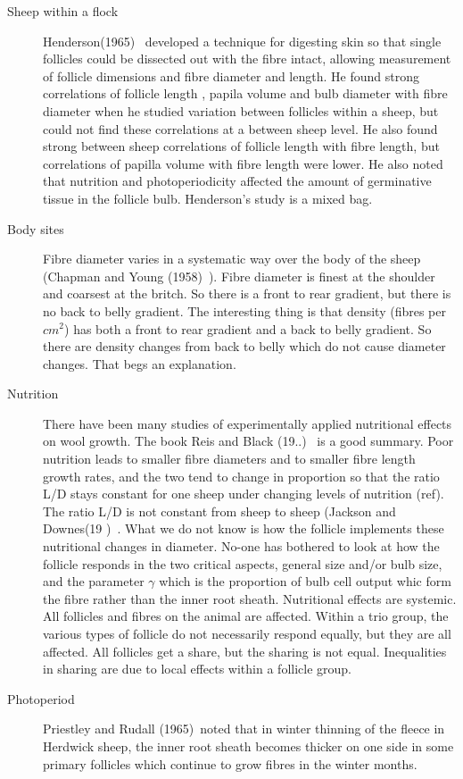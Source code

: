\documentclass[titlepage]{article}  %
\begin{document}
\begin{description}
\item[Sheep within a flock] Henderson(1965)~\cite{hend:65} developed a technique for digesting skin so that single follicles could be dissected out with the fibre intact, allowing measurement of follicle dimensions and fibre diameter and length. He found strong correlations of follicle length , papila volume and bulb diameter with fibre diameter when he studied variation between follicles within a sheep, but could not find these correlations at a between sheep level. He also found strong between sheep correlations of follicle length with fibre length, but correlations of papilla volume with fibre length were lower.  He also noted that nutrition and photoperiodicity affected the amount of germinative tissue in the follicle bulb. Henderson's study is a mixed bag.
\item[Body sites] Fibre diameter varies in a systematic way over the body of the sheep (Chapman and Young (1958)~\cite{chap:58}). Fibre diameter is finest at the shoulder and coarsest at the britch. So there is a front to rear gradient, but there is no back to belly gradient. The interesting thing is that density (fibres per $cm^{2}$) has both a front to rear gradient and a back to belly gradient.  So there are density changes from back to belly which do not cause diameter changes.  That begs an explanation.
\item[Nutrition]
There have been many studies of experimentally applied nutritional effects on wool growth. 
The book Reis and Black (19..)~\cite{} is a good summary.
Poor nutrition leads to smaller fibre diameters and to smaller fibre length growth rates, and the two tend to change in proportion so that the ratio L/D stays constant for one sheep under changing levels of nutrition (ref). The ratio L/D is not constant from sheep to sheep (Jackson and Downes(19  )~\cite{jack:}.
What we do not know is how the follicle implements these nutritional changes in diameter. No-one has bothered to look at how the follicle responds in the two critical aspects, general size and/or bulb size, and the parameter $\gamma$ which is the proportion of bulb cell output whic form the fibre rather than the inner root sheath.
Nutritional effects are systemic. All follicles and fibres on the animal are affected. Within a trio group, the various types of follicle do not necessarily respond equally, but they are all affected. All follicles get a share, but the sharing is not equal. Inequalities in sharing are due to local effects within a follicle group.
\item[Photoperiod] Priestley and Rudall (1965)~\cite{prie:65}noted that in winter thinning of the fleece in Herdwick sheep, the inner root sheath becomes thicker on one side in some primary follicles which continue to grow fibres in the winter months.

\end{description}
\end{document}
